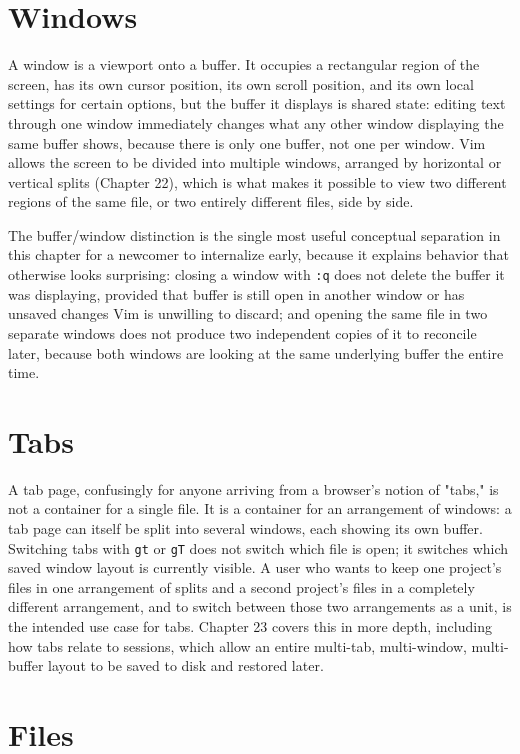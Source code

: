 \section{Windows}

A window is a viewport onto a buffer. It occupies a rectangular region of the screen, has its own cursor position, its own scroll position, and its own local settings for certain options, but the buffer it displays is shared state: editing text through one window immediately changes what any other window displaying the same buffer shows, because there is only one buffer, not one per window. Vim allows the screen to be divided into multiple windows, arranged by horizontal or vertical splits (Chapter 22), which is what makes it possible to view two different regions of the same file, or two entirely different files, side by side.

The buffer/window distinction is the single most useful conceptual separation in this chapter for a newcomer to internalize early, because it explains behavior that otherwise looks surprising: closing a window with \texttt{:q} does not delete the buffer it was displaying, provided that buffer is still open in another window or has unsaved changes Vim is unwilling to discard; and opening the same file in two separate windows does not produce two independent copies of it to reconcile later, because both windows are looking at the same underlying buffer the entire time.

\section{Tabs}

A tab page, confusingly for anyone arriving from a browser's notion of "tabs," is not a container for a single file. It is a container for an arrangement of windows: a tab page can itself be split into several windows, each showing its own buffer. Switching tabs with \texttt{gt} or \texttt{gT} does not switch which file is open; it switches which saved window layout is currently visible. A user who wants to keep one project's files in one arrangement of splits and a second project's files in a completely different arrangement, and to switch between those two arrangements as a unit, is the intended use case for tabs. Chapter 23 covers this in more depth, including how tabs relate to sessions, which allow an entire multi-tab, multi-window, multi-buffer layout to be saved to disk and restored later.

\section{Files}

